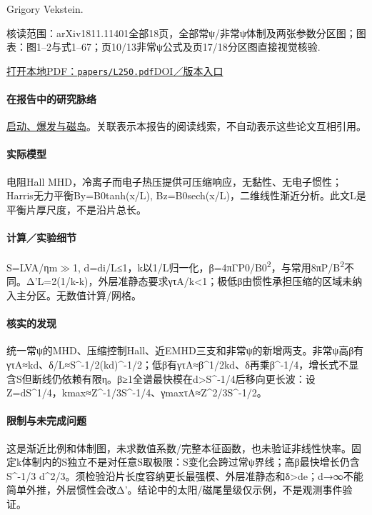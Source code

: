 Grigory Vekstein.

\textsf{核读范围：}arXiv1811.11401全部18页，全部常ψ/非常ψ体制及两张参数分区图；\textsf{图表：}图1–2与式1–67；页10/13非常ψ公式及页17/18分区图直接视觉核验.

\href{run:papers/L250.pdf}{打开本地PDF：\texttt{papers/L250.pdf}}\quad\href{https://arxiv.org/abs/1811.11401}{DOI／版本入口}

\paragraph{在报告中的研究脉络}\hyperref[story:onset]{启动、爆发与磁岛}。关联表示本报告的阅读线索，不自动表示这些论文互相引用。

\paragraph{实际模型}电阻Hall MHD，冷离子而电子热压提供可压缩响应，无黏性、无电子惯性；Harris无力平衡By=B0tanh(x/L), Bz=B0sech(x/L)，二维线性渐近分析。此文L是平衡片厚尺度，不是沿片总长。

\paragraph{计算／实验细节}S=LVA/ηm\ensuremath{\gg}1, d=di/L≤1，k以1/L归一化，β=4πΓP0/B0\textsuperscript{2}，与常用8πP/B\textsuperscript{2}不同。Δ'L=2(1/k-k)，外层准静态要求γτA/k<1；极低β由惯性承担压缩的区域未纳入主分区。无数值计算/网格。

\paragraph{核实的发现}统一常ψ的MHD、压缩控制Hall、近EMHD三支和非常ψ的新增两支。非常ψ高β有γτA≈kd、δ/L≈S\textasciicircum{}-1/2(kd)\textasciicircum{}-1/2；低β有γτA≈β\textasciicircum{}1/2kd、δ再乘β\textasciicircum{}-1/4，增长式不显含S但断线仍依赖有限η。β≥1全谱最快模在d>S\textasciicircum{}-1/4后移向更长波：设Z=dS\textasciicircum{}1/4，kmax≈Z\textasciicircum{}-1/3S\textasciicircum{}-1/4、γmaxτA≈Z\textasciicircum{}2/3S\textasciicircum{}-1/2。

\paragraph{限制与未完成问题}这是渐近比例和体制图，未求数值系数/完整本征函数，也未验证非线性快率。固定k体制内的S独立不是对任意S取极限：S变化会跨过常ψ界线；高β最快增长仍含S\textasciicircum{}-1/3 d\textasciicircum{}2/3。须检验沿片长度容纳更长最强模、外层准静态和δ>de；d→∞不能简单外推，外层惯性会改Δ'。结论中的太阳/磁尾量级仅示例，不是观测事件验证。

